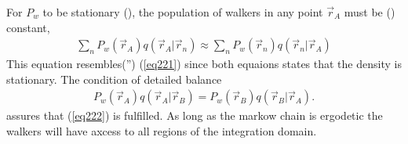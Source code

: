 \documentclass[a4paper,10pt,twocolumn]{article} %
\begin{document}
For $P_w$ to be stationary (), the population of walkers in any point $\vec r_A$ must be () constant,
\begin{align}
	\sum_n P_w(\vec r_A) q(\vec r_A|\vec r_n)  \approx	\sum_n P_w(\vec r_n) q(\vec r_n|\vec r_A) \label{eq222}
\end{align} 
This equation resembles('') (\ref{eq221}) since both equaions states that the density is stationary.
The condition of detailed balance
\begin{align}
    P_w(\vec r_A) q(\vec r_A|\vec r_B)  =  P_w(\vec r_B) q(\vec r_B|\vec r_A).\label{detbal}
\end{align}
assures that (\ref{eq222}) is fulfilled. 
As long as the markow chain is ergodetic the walkers will have axcess to all regions of the integration domain.
\end{document}
